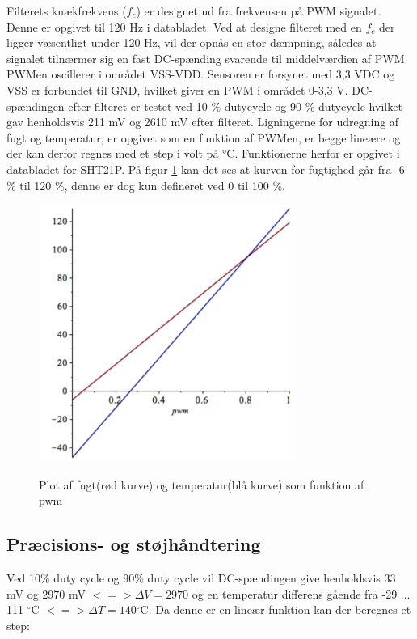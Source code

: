 Filterets knækfrekvens ($f_c$) er designet ud fra frekvensen på PWM signalet. Denne er opgivet til 120 Hz i databladet. Ved at designe filteret med en $f_c$ der ligger væsentligt under 120 Hz, vil der opnås en stor dæmpning, således at signalet tilnærmer sig en fast DC-spænding svarende til middelværdien af PWM. PWMen oscillerer i området VSS-VDD. Sensoren er forsynet med 3,3 VDC og VSS er forbundet til GND, hvilket giver en PWM i området 0-3,3 V. DC-spændingen efter filteret er testet ved 10 \% dutycycle og 90 \% dutycycle hvilket gav henholdsvis 211 mV og 2610 mV efter filteret. Ligningerne for udregning af fugt og temperatur, er opgivet som en funktion af PWMen, er begge lineære og der kan derfor regnes med et step i volt på °C. Funktionerne herfor er opgivet i databladet for SHT21P. 
På figur \ref{lab:sht_plot_mable} kan det ses at kurven for fugtighed går fra -6 \% til 120 \%, denne er dog kun defineret ved 0 til 100 \%. 

\begin{figure}[htb]
\centering
{\includegraphics[width=0.75\textwidth]{filer/design/Billeder/sht_plot_maple}}
\caption{Plot af fugt(rød kurve) og temperatur(blå kurve) som funktion af pwm}
\label{lab:sht_plot_mable}
\end{figure}

\subsection{Præcisions- og støjhåndtering}

Ved 10\% duty cycle og 90\% duty cycle vil DC-spændingen give henholdsvis 33 mV og 2970 mV $<=> \Delta V = 2970$ og en temperatur differens gående fra -29 ... 111 ${^{\circ}}$C $<=> \Delta T = 140 {^{\circ}}$C. Da denne er en lineær funktion kan der beregnes et step:

